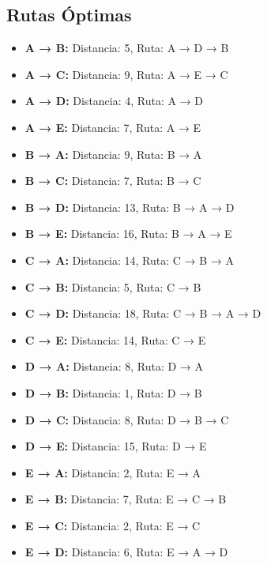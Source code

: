 \documentclass[12pt]{article}
\begin{document}
\clearpage
\subsection{Rutas Óptimas}
\begin{itemize}
\item \textbf{A → B:} Distancia: 5, Ruta: A → D → B
\item \textbf{A → C:} Distancia: 9, Ruta: A → E → C
\item \textbf{A → D:} Distancia: 4, Ruta: A → D
\item \textbf{A → E:} Distancia: 7, Ruta: A → E
\item \textbf{B → A:} Distancia: 9, Ruta: B → A
\item \textbf{B → C:} Distancia: 7, Ruta: B → C
\item \textbf{B → D:} Distancia: 13, Ruta: B → A → D
\item \textbf{B → E:} Distancia: 16, Ruta: B → A → E
\item \textbf{C → A:} Distancia: 14, Ruta: C → B → A
\item \textbf{C → B:} Distancia: 5, Ruta: C → B
\item \textbf{C → D:} Distancia: 18, Ruta: C → B → A → D
\item \textbf{C → E:} Distancia: 14, Ruta: C → E
\item \textbf{D → A:} Distancia: 8, Ruta: D → A
\item \textbf{D → B:} Distancia: 1, Ruta: D → B
\item \textbf{D → C:} Distancia: 8, Ruta: D → B → C
\item \textbf{D → E:} Distancia: 15, Ruta: D → E
\item \textbf{E → A:} Distancia: 2, Ruta: E → A
\item \textbf{E → B:} Distancia: 7, Ruta: E → C → B
\item \textbf{E → C:} Distancia: 2, Ruta: E → C
\item \textbf{E → D:} Distancia: 6, Ruta: E → A → D
\end{itemize}
\end{document}
